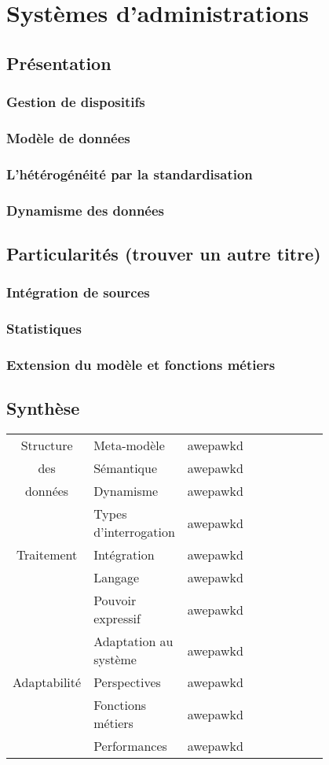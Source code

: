 \section{Systèmes d'administrations}
\subsection{Présentation}
\subsubsection{Gestion de dispositifs}
\subsubsection{Modèle de données}
\subsubsection{L'hétérogénéité par la standardisation}
\subsubsection{Dynamisme des données}
\subsection{Particularités (trouver un autre titre)}
\subsubsection{Intégration de sources}
\subsubsection{Statistiques}
\subsubsection{Extension du modèle et fonctions métiers}
\subsection{Synthèse}
\noindent \begin{tabular}{|c|p{0.2\linewidth}|p{0.6\linewidth}|} \hline
 Structure & Meta-modèle & awepawkd \\ \cline{2-3}
 des & Sémantique & awepawkd \\ \cline{2-3}
 données & Dynamisme & awepawkd \\ \hline
 & Types d'interrogation & awepawkd \\ \cline{2-3}
 Traitement & Intégration & awepawkd \\ \cline{2-3}
 & Langage & awepawkd \\ \cline{2-3}
 & Pouvoir expressif & awepawkd \\ \hline
 & Adaptation au système & awepawkd \\ \cline{2-3}
 Adaptabilité & Perspectives & awepawkd \\ \cline{2-3}
 & Fonctions métiers & awepawkd \\ \cline{2-3}
 & Performances & awepawkd \\ \hline
\end{tabular}
